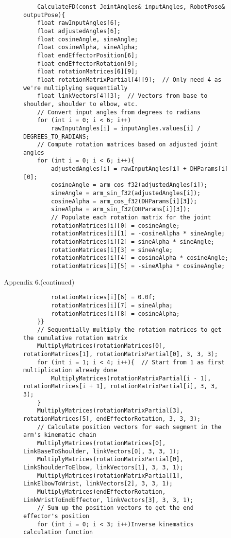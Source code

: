 \newpage
{}


\begin{figure}[H]
	\centering
	\begin{verbatim}
	CalculateFD(const JointAngles& inputAngles, RobotPose& outputPose){
    float rawInputAngles[6];
    float adjustedAngles[6];
    float cosineAngle, sineAngle;
    float cosineAlpha, sineAlpha;
    float endEffectorPosition[6];
    float endEffectorRotation[9];
    float rotationMatrices[6][9];
    float rotationMatrixPartial[4][9];  // Only need 4 as we're multiplying sequentially
    float linkVectors[4][3];  // Vectors from base to shoulder, shoulder to elbow, etc.
    // Convert input angles from degrees to radians
    for (int i = 0; i < 6; i++)
        rawInputAngles[i] = inputAngles.values[i] / DEGREES_TO_RADIANS;
    // Compute rotation matrices based on adjusted joint angles
    for (int i = 0; i < 6; i++){
        adjustedAngles[i] = rawInputAngles[i] + DHParams[i][0];
        cosineAngle = arm_cos_f32(adjustedAngles[i]);
        sineAngle = arm_sin_f32(adjustedAngles[i]);
        cosineAlpha = arm_cos_f32(DHParams[i][3]);
        sineAlpha = arm_sin_f32(DHParams[i][3]);
        // Populate each rotation matrix for the joint
        rotationMatrices[i][0] = cosineAngle;
        rotationMatrices[i][1] = -cosineAlpha * sineAngle;
        rotationMatrices[i][2] = sineAlpha * sineAngle;
        rotationMatrices[i][3] = sineAngle;
        rotationMatrices[i][4] = cosineAlpha * cosineAngle;
        rotationMatrices[i][5] = -sineAlpha * cosineAngle;
	\end{verbatim}
\end{figure}
\newpage
\hfill \large Appendix 6.(continued)
\begin{figure}[H]
	\centering
	\begin{verbatim}
		rotationMatrices[i][6] = 0.0f;
        rotationMatrices[i][7] = sineAlpha;
        rotationMatrices[i][8] = cosineAlpha;
    }}
	// Sequentially multiply the rotation matrices to get the cumulative rotation matrix
	MultiplyMatrices(rotationMatrices[0], rotationMatrices[1], rotationMatrixPartial[0], 3, 3, 3);
	for (int i = 1; i < 4; i++){  // Start from 1 as first multiplication already done
		MultiplyMatrices(rotationMatrixPartial[i - 1], rotationMatrices[i + 1], rotationMatrixPartial[i], 3, 3, 3);
	}
	MultiplyMatrices(rotationMatrixPartial[3], rotationMatrices[5], endEffectorRotation, 3, 3, 3);
	// Calculate position vectors for each segment in the arm's kinematic chain
	MultiplyMatrices(rotationMatrices[0], LinkBaseToShoulder, linkVectors[0], 3, 3, 1);
	MultiplyMatrices(rotationMatrixPartial[0], LinkShoulderToElbow, linkVectors[1], 3, 3, 1);
	MultiplyMatrices(rotationMatrixPartial[1], LinkElbowToWrist, linkVectors[2], 3, 3, 1);
	MultiplyMatrices(endEffectorRotation, LinkWristToEndEffector, linkVectors[3], 3, 3, 1);
	// Sum up the position vectors to get the end effector's position
	for (int i = 0; i < 3; i++)Inverse kinematics calculation function
	\end{verbatim}
\end{figure}

